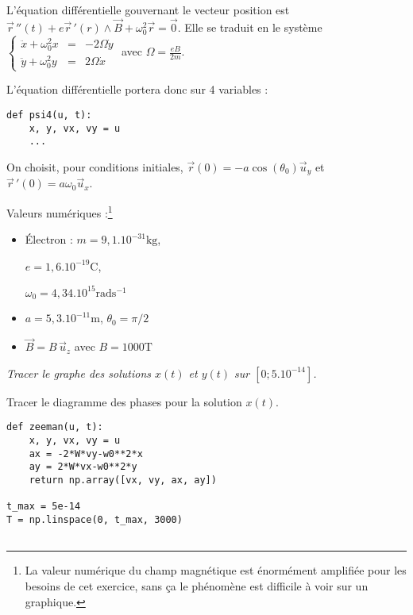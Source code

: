 \begin{minipage}{0.6\linewidth}
L'équation différentielle gouvernant le vecteur position est 
$\vec{r}\,''(t)+e\vec{r}\,'(r)\wedge\vec{B}+\omega_0^2\vec{r}=\vec{0}$.
Elle se traduit en le système
$\left\{\begin{matrix}
\ddot{x}+\omega_0^2x &=& -2\Omega\dot{y}\\ 
\ddot{y}+\omega_0^2y &=& 2\Omega\dot{x}
\end{matrix}\right.$
avec $\Omega=\frac{eB}{2m}$.

L'équation différentielle portera donc sur 4 variables :
\begin{lstlisting}
def psi4(u, t):
    x, y, vx, vy = u
    ...
\end{lstlisting}


On choisit, pour conditions initiales, $\vec{r}(0)=-a\cos(\theta_0)\vec{u}_y$ 
et $\vec{r}\,'(0)=a\omega_0\vec{u}_x$.

Valeurs numériques :\footnote{La valeur numérique du champ magnétique est énormément amplifiée pour les besoins de cet exercice, sans ça le phénomène est difficile à voir sur un graphique.}
	\begin{itemize}
	\item Électron : $m=9,1.10^{-31}\text{kg}$, 
	
	$e=1,6.10^{-19}\text{C}$, 
	
	$\omega_0=4,34.10^{15}\text{rad} \text{s}^{-1}$
	\item $a= 5,3.10^{-11}\text{m}$, $\theta_0=\pi/2$
	\item $\vec{B}=B\,\vec{u}_z$ avec $B= 1000\text{T}$
	\end{itemize}
\begin{Exercise}\it
Tracer le graphe des solutions $x(t)$ et $y(t)$ sur $[0; 5.10^{-14}]$.

Tracer le diagramme des phases pour la solution $x(t)$.
\end{Exercise}
\begin{Answer}
\begin{lstlisting}
def zeeman(u, t):
    x, y, vx, vy = u
    ax = -2*W*vy-w0**2*x
    ay = 2*W*vx-w0**2*y
    return np.array([vx, vy, ax, ay])

t_max = 5e-14
T = np.linspace(0, t_max, 3000)


\end{lstlisting}
\end{Answer}
\end{minipage}
